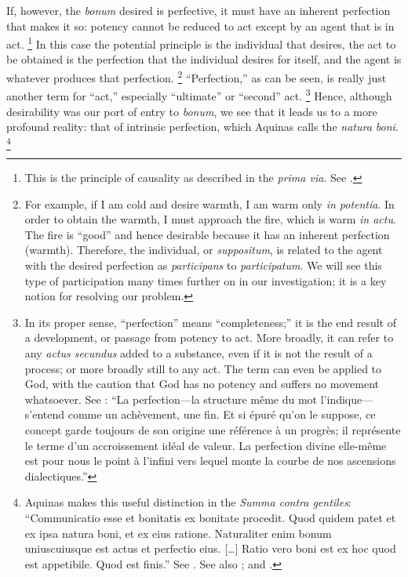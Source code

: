 If, however, the \emph{bonum} desired is perfective, it must have an inherent perfection that makes it so: potency cannot be reduced to act except by an agent that is in act.%
%
\footnote{This is the principle of causality as described in the \emph{prima via}. See \cite[I, q.~2, a.~3, co.]{st:summa}.}
%
In this case the potential principle is the individual that desires, the act to be obtained is the perfection that the individual desires for itself, and the agent is whatever produces that perfection.%
%
\footnote{For example, if I am cold and desire warmth, I am warm only \emph{in potentia}. In order to obtain the warmth, I must approach the fire, which is warm \emph{in actu}. The fire is “good” and hence desirable because it has an inherent perfection (warmth). Therefore, the individual, or \emph{suppositum}, is related to the agent with the desired perfection as \emph{participans} to \emph{participatum}. We will see this type of participation many times further on in our investigation; it is a key notion for resolving our problem.}
%
“Perfection,” as can be seen, is really just another term for “act,” especially “ultimate” or “second” act.%
%
\footnote{In its proper sense, “perfection” means “completeness;” it is the end result of a development, or passage from potency to act. More broadly, it can refer to any \emph{actus secundus} added to a substance, even if it is not the result of a process; or more broadly still to any act. The term can even be applied to God, with the caution that God has no potency and suffers no movement whatsoever.
See \cite[193]{definance:etre-et-agir}: “La perfection—la structure même du mot l’indique—s’entend comme un achèvement, une fin. Et si épuré qu’on le suppose, ce concept garde toujours de son origine une référence à un progrès; il représente le terme d’un accroissement idéal de valeur. La perfection divine elle-même est pour nous le point à l’infini vers lequel monte la courbe de nos ascensions dialectiques.”}
%
Hence, although desirability was our port of entry to \emph{bonum}, we see that it leads us to a more profound reality: that of intrinsic perfection, which Aquinas calls the \emph{natura boni}.%
%
\footnote{Aquinas makes this useful distinction in the \emph{Summa contra gentiles}: “Communicatio esse et bonitatis ex bonitate procedit. Quod quidem patet et ex ipsa natura boni, et ex eius ratione. Naturaliter enim bonum uniuscuiusque est actus et perfectio eius. [\ldots] Ratio vero boni est ex hoc quod est appetibile. Quod est finis.” See \cite[I, cap.~37, n.~5 (Marietti n.~307)]{st:contragent}.
See also \cite[65]{aertsen:good_as_transcendental}; and \cite[190]{definance:etre-et-agir}.}
